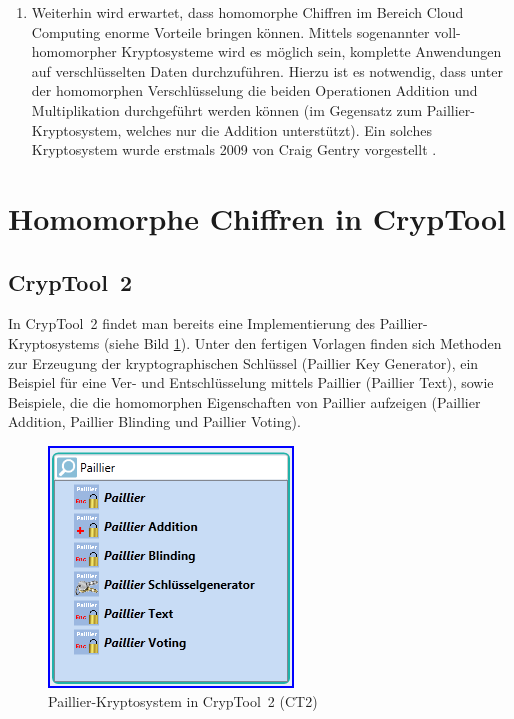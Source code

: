 \begin{refsegment}
\begin{enumerate}
\item Weiterhin wird erwartet, dass homomorphe Chiffren im Bereich Cloud Computing enorme Vorteile bringen können. Mittels sogenannter voll-homomorpher Kryptosysteme \cite{Wiki_HomEnc} wird es möglich sein, komplette Anwendungen auf verschlüsselten Daten durchzuführen. Hierzu ist es notwendig, dass unter der homomorphen Verschlüsselung die beiden Operationen Addition und Multiplikation durchgeführt werden können (im Gegensatz zum Paillier-Kryptosystem, welches nur die Addition unterstützt). Ein solches Kryptosystem wurde erstmals 2009 von Craig Gentry vorgestellt \cite{Gentry2009}.
\end{enumerate}

\section{Homomorphe Chiffren in CrypTool}

\subsection{CrypTool~2}
In CrypTool~2 findet man bereits eine Implementierung des Paillier-Kryptosystems (siehe Bild \ref{CT2-Paillier}). Unter den fertigen Vorlagen finden sich Methoden zur Erzeugung der kryptographischen Schlüssel (Paillier Key Generator), ein Beispiel für eine Ver- und Entschlüsselung mittels Paillier (Paillier Text), sowie Beispiele, die die homomorphen Eigenschaften von Paillier aufzeigen (Paillier Addition, Paillier Blinding und Paillier Voting).

\begin{figure}[ht]
\begin{center}
\includegraphics[scale=0.8]{figures/CT2-Paillier.png}
\caption{Paillier-Kryptosystem in CrypTool~2 (CT2)}
\label{CT2-Paillier}
\end{center}
\end{figure}



\end{refsegment}
